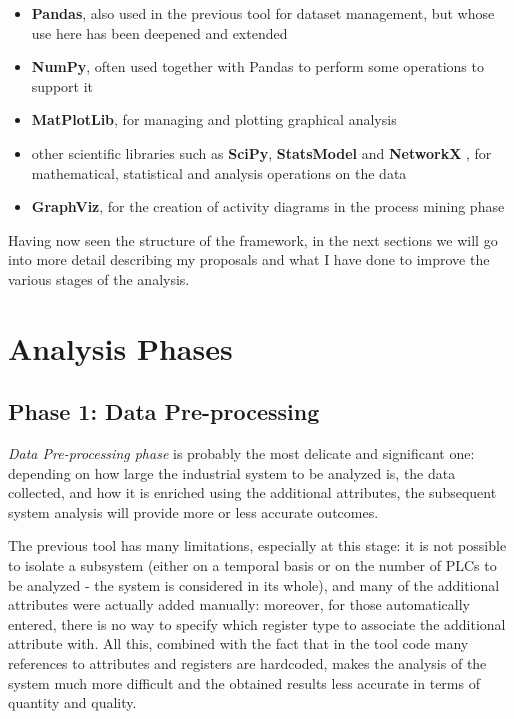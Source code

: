 \begin{itemize}
	\item \textbf{Pandas}, also used in the previous tool for dataset management, but whose use here has been deepened and extended	
	\item \textbf{NumPy}, often used together with Pandas to perform some operations to support it
	
	\item \textbf{MatPlotLib}, for managing and plotting graphical analysis
	
	\item other scientific libraries such as \textbf{SciPy}, \textbf{StatsModel} \cite{statsmodel} and \textbf{NetworkX} \cite{networkx}, for mathematical, statistical and analysis operations on the data
	
	\item \textbf{GraphViz}, for the creation of activity diagrams in the process mining phase
\end{itemize}
Having now seen the structure of the framework, in the next sections we will go into more detail describing my proposals and what I have done to improve the various stages of the analysis.

\section{Analysis Phases}

\subsection{Phase 1: Data Pre-processing}
\label{subsec:improve_preprocessing}
\textit{Data Pre-processing phase} is probably the most delicate and significant one: depending on how large the industrial system to be analyzed is, the data collected, and how it is enriched using the additional attributes, the subsequent system analysis will provide more or less accurate outcomes.

\bigskip
The previous tool has many limitations, especially at this stage: it is not possible to isolate a subsystem (either on a temporal basis or on the number of PLCs to be analyzed - the system is considered in its whole), and many of the additional attributes were actually added manually: moreover, for those automatically entered, there is no way to specify which register type to associate the additional attribute with.\newline
All this, combined with the fact that in the tool code many references to attributes and registers are hardcoded, makes the analysis of the system much more difficult and the obtained results less accurate in terms of quantity and quality.

